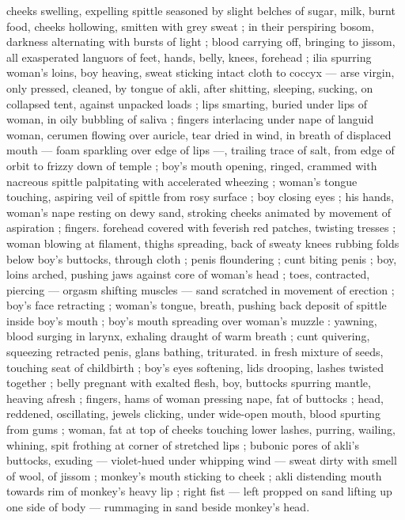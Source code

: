cheeks swelling, expelling spittle seasoned by slight belches of 
sugar, milk, burnt food, cheeks hollowing, smitten with grey sweat ; 
in their perspiring bosom, darkness alternating with bursts of light ; 
blood carrying off, bringing to jissom, all exasperated languors of 
feet, hands, belly, knees, forehead ; ilia spurring woman's loins, boy 
heaving, sweat sticking intact cloth to coccyx --- arse virgin, only 
pressed, cleaned, by tongue of akli, after shitting, sleeping, sucking, 
on collapsed tent, against unpacked loads ; lips smarting, buried 
under lips of woman, in oily bubbling of saliva ; fingers interlacing 
under nape of languid woman, cerumen flowing over auricle, tear 
dried in wind, in breath of displaced mouth --- foam sparkling over 
edge of lips ---, trailing trace of salt, from edge of orbit to frizzy 
down of temple ; boy's mouth opening, ringed, crammed with 
nacreous spittle palpitating with accelerated wheezing ; woman's 
tongue touching, aspiring veil of spittle from rosy surface ; boy 
closing eyes ; his hands, woman's nape resting on dewy sand, 
stroking cheeks animated by movement of aspiration ; fingers. 
forehead covered with feverish red patches, twisting tresses ; woman 
blowing at filament, thighs spreading, back of sweaty knees rubbing 
folds below boy's buttocks, through cloth ; penis floundering ; cunt 
biting penis ; boy, loins arched, pushing jaws against core of 
woman's head ; toes, contracted, piercing --- orgasm shifting 
muscles --- sand scratched in movement of erection ; boy's face 
retracting ; woman's tongue, breath, pushing back deposit of spittle 
inside boy's mouth ; boy's mouth spreading over woman's muzzle : 
yawning, blood surging in larynx, exhaling draught of warm breath ; 
cunt quivering, squeezing retracted penis, glans bathing, triturated. 
in fresh mixture of seeds, touching seat of childbirth ; boy's eyes 
softening, lids drooping, lashes twisted together ; belly pregnant with 
exalted flesh, boy, buttocks spurring mantle, heaving afresh ; fingers, 
hams of woman pressing nape, fat of buttocks ; head, reddened, 
oscillating, jewels clicking, under wide-open mouth, blood spurting 
from gums ; woman, fat at top of cheeks touching lower lashes, 
purring, wailing, whining, spit frothing at corner of stretched lips ; 
bubonic pores of akli's buttocks, exuding --- violet-hued under 
whipping wind --- sweat dirty with smell of wool, of jissom ; 
monkey's mouth sticking to cheek ; akli distending mouth towards 
rim of monkey's heavy lip ; right fist --- left propped on sand lifting 
up one side of body --- rummaging in sand beside monkey's head. 
